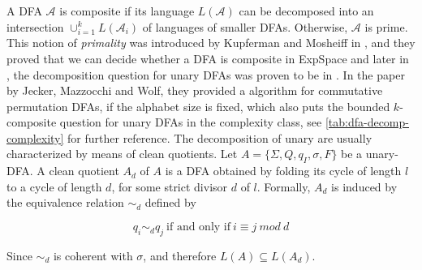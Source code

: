 A DFA $\mathcal{A}$ is composite if its language $L(\mathcal{A})$ can be decomposed into an intersection $\cup^k_{i=1} L(\mathcal{A}_i)$ of languages of smaller DFAs. Otherwise, $\mathcal{A}$ is prime. This notion of \textit{primality} was introduced by Kupferman and Mosheiff in \cite{prime-languages}, and they proved that we can decide whether a DFA is composite in ExpSpace and later in \cite{unara-prime-languages}, the decomposition question for unary DFAs was proven to be in \LogSpace. In the paper~\cite{DBLP:journals/corr/abs-2107-04683} by Jecker, Mazzocchi and Wolf, they provided a \LogSpace algorithm for commutative permutation DFAs, if the alphabet size is fixed, which also puts the bounded $k$-composite question for unary DFAs in the \LogSpace complexity class, see \ref{tab:dfa-decomp-complexity} for further reference. The decomposition of unary \DFAs are usually characterized by means of clean quotients. Let  $A = \lbrace\Sigma, Q, q_I , \sigma, F\rbrace$ be a unary-DFA. A clean quotient $A_d$ of $A$ is a DFA obtained by folding its cycle of length $l$ to a cycle of length $d$, for some strict divisor $d$ of $l$. Formally, $A_d$ is induced by the equivalence relation $\sim_d$ defined by

\[ q_i \sim_d q_j ~\text{if and only if}~i \equiv j ~mod~ d \]

Since $\sim_d$ is coherent with $\sigma$, and therefore $L(A) \subseteq L(A_d)$.


